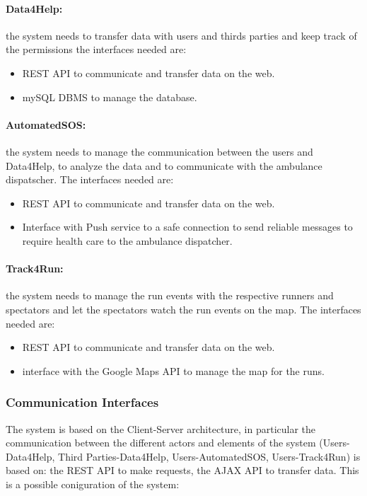 \documentclass[a4paper]{article}
\begin{document}
    \paragraph{Data4Help:} the system needs to transfer data with users and thirds parties and keep track of the permissions the interfaces needed are:
    \begin{itemize}
        \item REST API to communicate and transfer data on the web.
        \item mySQL DBMS to manage the database.
    \end{itemize}
    
    \paragraph{AutomatedSOS:} the system needs to manage the communication between the users and Data4Help, to analyze the data and to communicate with the ambulance dispatscher. The interfaces needed are:
    
    \begin{itemize}
        \item REST API to communicate and transfer data on the web.
        \item Interface with Push service to a safe connection to send reliable messages to require health care to the ambulance dispatcher.
    \end{itemize}
    
    \paragraph{Track4Run:} the system needs to manage the run events with the respective runners and spectators and let the spectators watch the run events on the map. The interfaces needed are:
    
    \begin{itemize}
        \item REST API to communicate and transfer data on the web.
        \item interface with the Google Maps API to manage the map for the runs.
    \end{itemize}
    
    
    \subsubsection{Communication Interfaces}
    
    The system is based on the Client-Server architecture, in particular the communication between the different actors and elements of the system (Users-Data4Help, Third Parties-Data4Help, Users-AutomatedSOS, Users-Track4Run) is based on: the REST API to make requests, the AJAX API to transfer data.
    This is a possible coniguration of the system:
    
\end{document}
